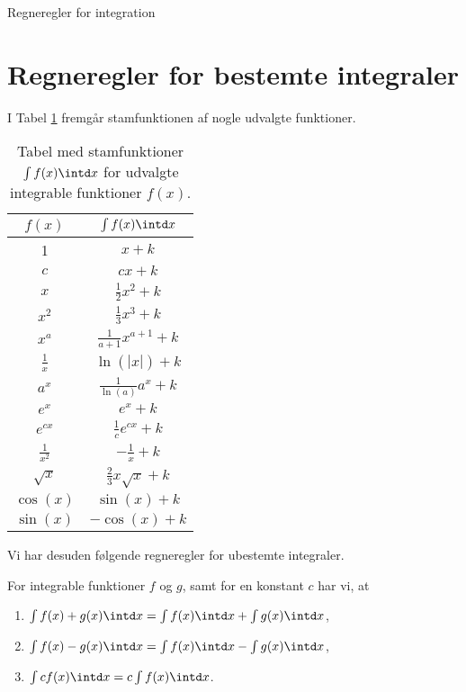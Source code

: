 
\begin{center}
\Huge
Regneregler for integration
\end{center}

\section*{Regneregler for bestemte integraler}
I Tabel \ref{tab:int} fremgår stamfunktionen af nogle udvalgte funktioner.
\begin{table}[H]
\center
\begin{tabular}{c|c}
$f(x)$ & $\int f(x)\intd x$\\
\hline
1 & $x+k$\\
$c$ & $cx+k$\\
$x$ & $\frac{1}{2}x^{2}+k$\\
$x^2$ & $\frac{1}{3}x^3+k$\\
$x^a$ & $\frac{1}{a+1}x^{a+1}+k$\\
$\frac{1}{x}$ & $\ln(|x|)+k$\\
$a^x$ & $\frac{1}{\ln(a)}a^x+k$\\
$e^x$ & $e^x+k$\\
$e^{cx}$ & $\frac{1}{c}e^{cx}+k$\\
$\frac{1}{x^2}$ & $-\frac{1}{x} +k$\\
$\sqrt{x}$ & $\frac{2}{3}x\sqrt{x}+k$\\
$\cos(x)$ & $\sin(x)+k$\\
$\sin(x)$ & $-\cos(x)+k$
\end{tabular}
\caption{Tabel med stamfunktioner $\int f(x) \intd x$ for udvalgte integrable funktioner $f(x)$.}
\label{tab:int}
\end{table}
Vi har desuden følgende regneregler for ubestemte integraler.
\begin{setn}
For integrable funktioner $f$ og $g$, samt for en konstant $c$ har vi, at
\begin{enumerate}[label=\roman*)]
\item $\int f(x)+g(x) \intd x = \int f(x) \intd x + \int g(x) \intd x$,
\item $\int f(x)-g(x) \intd x = \int f(x) \intd x - \int g(x) \intd x$,
\item $\int cf(x) \intd x = c\int f(x) \intd x$.
\end{enumerate}
\end{setn}
